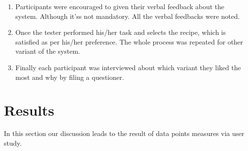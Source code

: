\begin{enumerate}
 	\item Participants were encouraged to given their verbal feedback about the system. Although it'ss not mandatory. All the verbal feedbacks were noted. 
 	
 	\item Once the tester performed his/her task and selects the recipe, which is satisfied as per his/her preference. The whole process was repeated for other variant of the system. 
	\item Finally each participant was interviewed about which  variant they liked the most and why by filing a questioner. 
 \end{enumerate}
 
\section{Results}
In this section our discussion leads to the result of data points measures via user study.  
